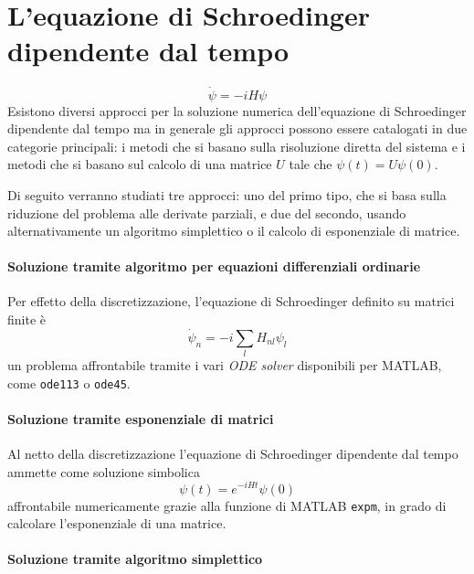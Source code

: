 \documentclass[a4paper,11pt,twoside,twocolumn]{article}
\begin{document}
\section{L'equazione di Schroedinger dipendente dal tempo}
\begin{equation}
    \dot{\psi}=-iH\psi
\end{equation}
Esistono diversi approcci per la soluzione numerica dell'equazione di Schroedinger dipendente dal tempo ma in generale gli approcci possono essere catalogati in due categorie principali: i metodi che si basano sulla risoluzione diretta del sistema e i metodi che si basano sul calcolo di una matrice \(U\) tale che \(\psi(t)=U\psi(0)\).

Di seguito verranno studiati tre approcci: uno del primo tipo, che si basa sulla riduzione del problema alle derivate parziali, e due del secondo, usando alternativamente un algoritmo simplettico o il calcolo di esponenziale di matrice.

\paragraph{Soluzione tramite algoritmo per equazioni differenziali ordinarie}

Per effetto della discretizzazione, l'equazione di Schroedinger definito su matrici finite è 
\begin{equation}
    \dot{\psi}_n=-i\sum_l H_{nl}\psi_{l}
    \label{tschr}
\end{equation}
un problema affrontabile tramite i vari \textit{ODE solver} disponibili per MATLAB, come \verb|ode113| o \verb|ode45|.

\paragraph{Soluzione tramite esponenziale di matrici}

Al netto della discretizzazione l'equazione di Schroedinger dipendente dal tempo ammette come soluzione simbolica
\begin{equation}
    \psi(t)=e^{-iHt}\psi(0)
    \label{expm}
\end{equation}
affrontabile numericamente grazie alla funzione di MATLAB \verb|expm|, in grado di calcolare l'esponenziale di una matrice.

\paragraph{Soluzione tramite algoritmo simplettico}
\end{document}
